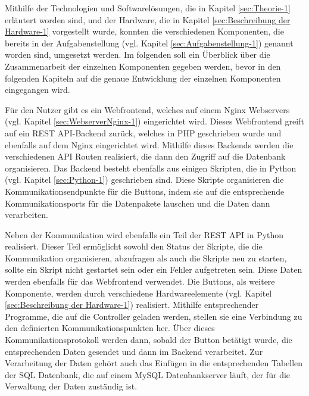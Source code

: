 Mithilfe der Technologien und Softwarelösungen, die in Kapitel \ref{sec:Theorie-1} erläutert worden sind, und der Hardware, die in Kapitel \ref{sec:Beschreibung der Hardware-1} vorgestellt wurde, konnten die verschiedenen Komponenten, die bereits in der Aufgabenstellung (vgl. Kapitel \ref{sec:Aufgabenstellung-1}) genannt worden sind, umgesetzt werden. 
Im folgenden soll ein Überblick über die Zusammenarbeit der einzelnen Komponenten gegeben werden, bevor in den folgenden Kapiteln auf die genaue Entwicklung der einzelnen Komponenten eingegangen wird. 

Für den Nutzer gibt es ein Webfrontend, welches auf einem Nginx Webservers (vgl. Kapitel \ref{sec:WebserverNginx-1}) eingerichtet wird. Dieses Webfrontend greift auf ein \ac{REST} \ac{API}-Backend zurück, welches in \ac{PHP} geschrieben wurde und ebenfalls auf dem Nginx eingerichtet wird. Mithilfe dieses Backends werden die verschiedenen \ac{API} Routen realisiert, die dann den Zugriff auf die Datenbank organisieren. Das Backend besteht ebenfalls aus einigen Skripten, die in Python (vgl. Kapitel \ref{sec:Python-1}) geschrieben sind. Diese Skripte organisieren die Kommunikationsendpunkte für die Buttons, indem sie auf die entsprechende Kommunikationsports für die Datenpakete lauschen und die Daten dann verarbeiten. 

Neben der Kommunikation wird ebenfalls ein Teil der \ac{REST} \ac{API} in Python realisiert. Dieser Teil ermöglicht sowohl den Status der Skripte, die die Kommunikation organisieren, abzufragen als auch die Skripte neu zu starten, sollte ein Skript nicht gestartet sein oder ein Fehler aufgetreten sein. Diese Daten werden ebenfalls für das Webfrontend verwendet. 
Die Buttons, als weitere Komponente, werden durch verschiedene Hardwareelemente (vgl. Kapitel \ref{sec:Beschreibung der Hardware-1}) realisiert. Mithilfe entsprechender Programme, die auf die Controller geladen werden, stellen sie eine Verbindung zu den definierten Kommunikationspunkten her. Über dieses Kommunikationsprotokoll werden dann, sobald der Button betätigt wurde, die entsprechenden Daten gesendet und dann im Backend verarbeitet. 
Zur Verarbeitung der Daten gehört auch das Einfügen in die entsprechenden Tabellen der SQL Datenbank, die auf einem MySQL Datenbankserver läuft, der für die Verwaltung der Daten zuständig ist. 
